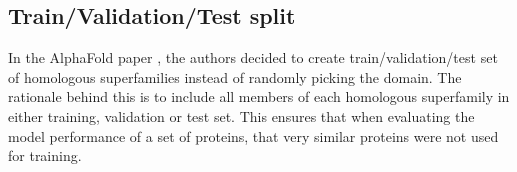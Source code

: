     
    
    
    
\subsection{Train/Validation/Test split}
    
In the AlphaFold paper \cite{alphafold}, the authors decided to create train/validation/test set of homologous superfamilies instead of randomly picking the domain. 
The rationale behind this is to include all members of each homologous superfamily in either training, validation or test set. 
This ensures that when evaluating the model performance of a set of proteins, that very similar proteins were not used for training. 
    
